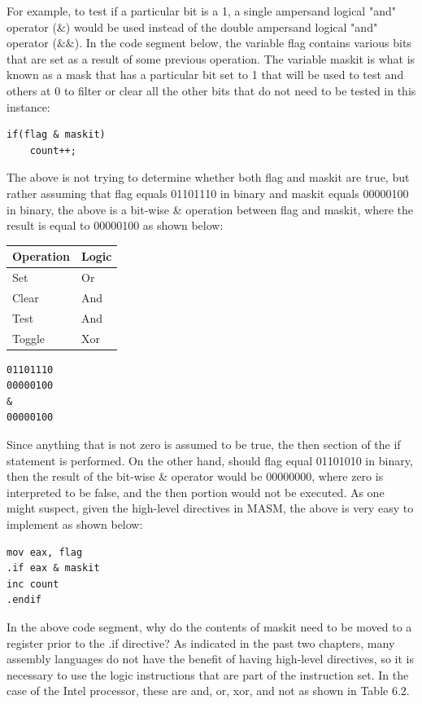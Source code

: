 \documentclass[10pt]{book}
\begin{document}
For example, to test if a particular bit is a 1, a single ampersand logical "and" operator ($\&$) would be used instead of the double ampersand logical "and" operator ($\&\&$). In the code segment below, the variable flag contains various bits that are set as a result of some previous operation. The variable maskit is what is known as a mask that has a particular bit set to 1 that will be used to test and others at 0 to filter or clear all the other bits that do not need to be tested in this instance:

\begin{verbatim}
if(flag & maskit)
    count++;
\end{verbatim}

The above is not trying to determine whether both flag and maskit are true, but rather assuming that flag equals 01101110 in binary and maskit equals 00000100 in binary, the above is a bit-wise & operation between flag and maskit, where the result is equal to 00000100 as shown below:

\begin{center}
\begin{tabular}{|ll|}
\hline
\textbf{Operation} & \textbf{Logic} \\
\hline
Set & Or \\
Clear & And \\
Test & And \\
Toggle & Xor \\
\hline
\end{tabular}
\end{center}

\begin{verbatim}
01101110
00000100
&
00000100
\end{verbatim}

Since anything that is not zero is assumed to be true, the then section of the if statement is performed. On the other hand, should flag equal 01101010 in binary, then the result of the bit-wise & operator would be 00000000, where zero is interpreted to be false, and the then portion would not be executed. As one might suspect, given the high-level directives in MASM, the above is very easy to implement as shown below:
\begin{verbatim}
mov eax, flag
.if eax & maskit
inc count
.endif
\end{verbatim}

In the above code segment, why do the contents of maskit need to be moved to a register prior to the .if directive? As indicated in the past two chapters, many assembly languages do not have the benefit of having high-level directives, so it is necessary to use the logic instructions that are part of the instruction set. In the case of the Intel processor, these are and, or, xor, and not as shown in Table 6.2.
\end{document}
